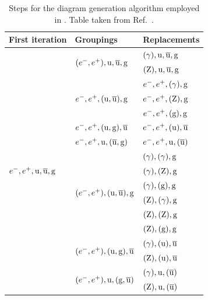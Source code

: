 \begin{table}[t]
  \caption{Steps for the diagram generation algorithm employed in \MADGRAPH. Table taken from
Ref.~\cite{Alwall:2011uj}. 
  \label{tab:madgraph_diagrams}}
  \begin{center}
  {\setlength{\tabcolsep}{1.5eM}
  \begin{tabular}{l l l}
  \toprule
  First iteration & Groupings & Replacements \\
  \midrule
  \multirow{17}{*}{$e^-,e^+,\mathrm{u},\overline{\mathrm{u}},\mathrm{g}$} & \multirow{2}{*}{$(e^-,e^+),\mathrm{u},\overline{\mathrm{u}},\mathrm{g}$} &
$(\gamma), \mathrm{u}, \overline{\mathrm{u}}, \mathrm{g}$ \\
  & & $(\mathrm{Z}), \mathrm{u}, \overline{\mathrm{u}}, \mathrm{g}$ \\ \cmidrule(lr){2-3}
  & \multirow{3}{*}{$e^- , e^+ , (\mathrm{u}, \overline{\mathrm{u}}), \mathrm{g}$} & $e^- , e^+ , (\gamma), \mathrm{g}$ \\
  & & $e^- , e^+ , (\mathrm{Z}), \mathrm{g}$ \\
  & & $e^- , e^+ , (\mathrm{g}), \mathrm{g}$\\ \cmidrule(lr){2-3}
  & $e^- , e^+ , (\mathrm{u}, \mathrm{g}), \overline{\mathrm{u}}$ & $e^- , e^+ , (\mathrm{u}), \overline{\mathrm{u}}$\\ \cmidrule(lr){2-3}
  & $e^- , e^+ , \mathrm{u}, (\overline{\mathrm{u}},\mathrm{g})$ & $e^- , e^+ , \mathrm{u}, (\overline{\mathrm{u}})$\\ \cmidrule(lr){2-3}
  & \multirow{6}{*}{$(e^- , e^+ ), (\mathrm{u}, \overline{\mathrm{u}}), \mathrm{g}$} & $(\gamma), (\gamma), \mathrm{g}$ \\
  & & $(\gamma), (\mathrm{Z}), \mathrm{g}$\\
  & & $(\gamma ), (\mathrm{g}), \mathrm{g}$\\
  & & $(\mathrm{Z} ), (\gamma), \mathrm{g}$\\
  & & $(\mathrm{Z} ), (\mathrm{Z}), \mathrm{g}$\\
  & & $(\mathrm{Z} ), (\mathrm{g}), \mathrm{g}$\\ \cmidrule(lr){2-3}
  & \multirow{2}{*}{$(e^- , e^+ ), (\mathrm{u}, \mathrm{g}), \overline{\mathrm{u}}$} & $(\gamma ), (\mathrm{u}), \overline{\mathrm{u}}$\\
  & & $(\mathrm{Z} ), (\mathrm{u}), \overline{\mathrm{u}}$ \\ \cmidrule(lr){2-3}
  & \multirow{2}{*}{$(e^- , e^+ ), \mathrm{u}, (\mathrm{g}, \overline{\mathrm{u}})$} & $(\gamma ), \mathrm{u}, (\overline{\mathrm{u}})$\\
  & & $(\mathrm{Z} ), \mathrm{u}, (\overline{\mathrm{u}})$\\ 
  \bottomrule
  \end{tabular}
  }
  \end{center}
\end{table}

